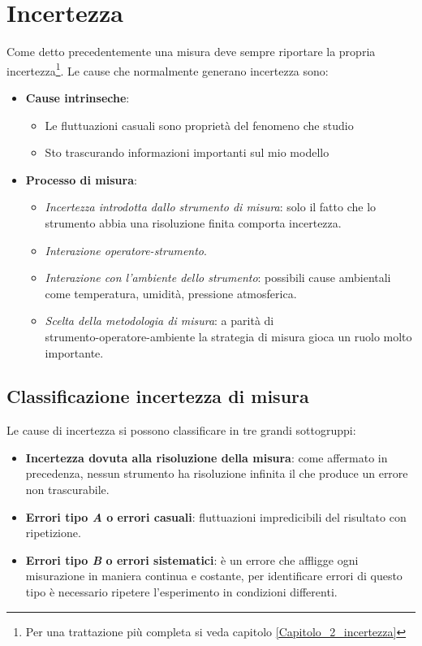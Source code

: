 \documentclass[11pt,a4paper]{book}
\begin{document}
\section{Incertezza}  
Come detto precedentemente una misura deve sempre riportare la propria incertezza\footnote{Per una trattazione più completa si veda capitolo \ref{Capitolo_2_incertezza}}. Le cause che normalmente generano incertezza sono:
\begin{itemize}
\item \textbf{Cause intrinseche}:
\begin{itemize}
\item Le fluttuazioni casuali sono proprietà del fenomeno che studio
\item Sto trascurando informazioni importanti sul mio modello
\end{itemize}
\item \textbf{Processo di misura}:
\begin{itemize}
\item \textit{Incertezza introdotta dallo strumento di misura}: solo il fatto che lo strumento abbia una risoluzione finita comporta incertezza.
\item \textit{Interazione operatore-strumento}.
\item \textit{Interazione con l'ambiente dello strumento}: possibili cause ambientali come temperatura, umidità, pressione atmosferica.
\item \textit{Scelta della metodologia di misura}: a parità di\\ strumento-operatore-ambiente la strategia di misura gioca un ruolo molto importante.
\end{itemize}
\end{itemize}
\subsection{Classificazione incertezza di misura}
Le cause di incertezza si possono classificare in tre grandi sottogruppi:
\begin{itemize} 
\item \textbf{Incertezza dovuta alla risoluzione della misura}: come affermato in precedenza, nessun strumento ha risoluzione infinita il che produce un errore non trascurabile.
\item \textbf{Errori tipo \textit{A} o errori casuali}: fluttuazioni impredicibili del risultato con ripetizione.
\item \textbf{Errori tipo \textit{B} o errori sistematici}: è un errore che affligge ogni misurazione in maniera continua e costante, per identificare errori di questo tipo è necessario ripetere l'esperimento in condizioni differenti. \label{1.2.1_Descrizione errore sistematico}
\end{itemize}
\end{document}
